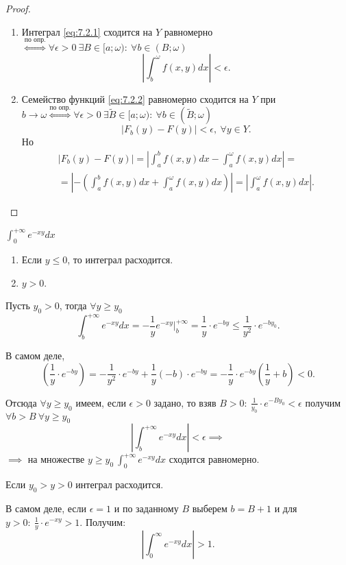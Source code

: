 \begin{proof}\leavevmode
    \begin{enumerate}
        \item Интеграл \ref{eq:7.2.1} сходится на $ Y $ равномерно $ \overset{\text{по опр.}}{\iff} \forall \epsilon > 0 \ \exists B \in [a;\omega): \ \forall b \in (B;\omega) $
              \[
                  \left|\int_{b}^{\omega}f(x,y)dx\right| < \epsilon.
              \]
        \item Семейство функций \ref{eq:7.2.2} равномерно сходится на $ Y $ при $ b \rightarrow \omega \overset{\text{по опр.}}{\iff} \forall \epsilon > 0 \ \exists \widetilde{B} \in [a;\omega): \ \forall b \in (\widetilde{B};\omega) $
              \[
                  \big|F_b(y) - F(y)\big| < \epsilon, \ \forall y \in Y.
              \]
              Но
              \begin{multline*}
                  \big|F_b(y) - F(y)\big| = \left|\int_{a}^{b}f(x,y)dx - \int_{a}^{\omega}f(x,y)dx\right| = \\
                  = \left|-\left(\int_{a}^{b}f(x,y)dx + \int_{a}^{\omega}f(x,y)dx\right)\right| = \left|\int_{a}^{\omega}f(x,y)dx\right|.
              \end{multline*}
    \end{enumerate}
\end{proof}

\begin{example}
    $ \int_{0}^{+\infty}e^{-xy}dx $
    \begin{enumerate}
        \item Если $ y \leqslant 0 $, то интеграл расходится.
        \item $ y > 0 $.
    \end{enumerate}

    Пусть $ y_0 > 0 $, тогда $ \forall y \geqslant y_0 $
    \[
        \int_{b}^{+\infty}e^{-xy}dx = - \frac{1}{y}e^{-xy}\Big|_b^{+\infty} = \frac{1}{y} \cdot e^{-by} \leqslant \frac{1}{y^2}\cdot e^{-by_0}.
    \]

    В самом деле,
    \[
        \left(\frac{1}{y}\cdot e^{-by}\right) = -\frac{1}{y^2}\cdot e^{-by} + \frac{1}{y}(-b)\cdot e^{-by} = -\frac{1}{y}\cdot e^{-by}\left(\frac{1}{y} + b\right) < 0.
    \]

    Отсюда $ \forall y \geqslant y_0 $ имеем, если $ \epsilon > 0 $ задано, то взяв $ B > 0: \ \frac{1}{y_0}\cdot e^{-By_0} < \epsilon $ получим $ \forall b > B \ \forall y \geqslant y_0 $
    \[
        \left|\int_{b}^{+\infty}e^{-xy}dx\right| < \epsilon \implies
    \]
    $ \implies $ на множестве $ y \geqslant y_0 \ \int_{0}^{+\infty}e^{-xy}dx $ сходится равномерно.

    Если $y_0 > y > 0$ интеграл расходится.

    В самом деле, если $\epsilon = 1$ и по заданному $B$ выберем $b = B+1$ и для $y > 0: \ \frac{1}{y}\cdot e^{-xy} > 1$. Получим:
    \[
        \left|\int_{0}^{\infty}e^{-xy}dx\right| > 1.
    \]
\end{example}

